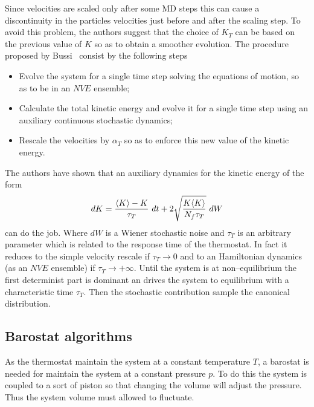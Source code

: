 Since velocities are scaled only after some \ac{MD} steps this can cause a discontinuity in the particles velocities just before and after the scaling step. To avoid this problem, the authors suggest that the choice of $K_T$ can be based on the previous value of $K$ so as to obtain a smoother evolution. The procedure proposed by Bussi \etal\, consist by the following steps
\begin{itemize}
	\item Evolve the system for a single time step solving the equations of motion, so as to be in an $NVE$ ensemble;
	\item Calculate the total kinetic energy and evolve it for a single time step using an auxiliary continuous stochastic dynamics;
	\item Rescale the velocities by $\alpha_T$ so as to enforce this new value of the kinetic energy.
\end{itemize}
The authors have shown that an auxiliary dynamics for the kinetic energy of the form
\begin{equation*}
	dK = \frac{\langle K \rangle - K}{\tau_T}\ dt + 2 \sqrt{\frac{K\langle K \rangle}{N_f\tau_T}}\ dW
\end{equation*}
can do the job. Where $dW$ is a Wiener stochastic noise and $\tau_T$ is an arbitrary parameter which is related to the response time of the thermostat. In fact it reduces to the simple velocity rescale if $\tau_T\rightarrow 0$ and to an Hamiltonian dynamics (as an $NVE$ ensemble) if $\tau_T\rightarrow +\infty$. Until the system is at non--equilibrium the first determinist part is dominant an drives the system to equilibrium with a characteristic time $\tau_T$. Then the stochastic contribution sample the canonical distribution.
 

\subsection{Barostat algorithms} %
As the thermostat maintain the system at a constant temperature $T$, a barostat is needed for maintain the system at a constant pressure $p$. To do this the system is coupled to a sort of piston so that changing the volume will adjust the pressure. Thus the system volume must allowed to fluctuate. 

